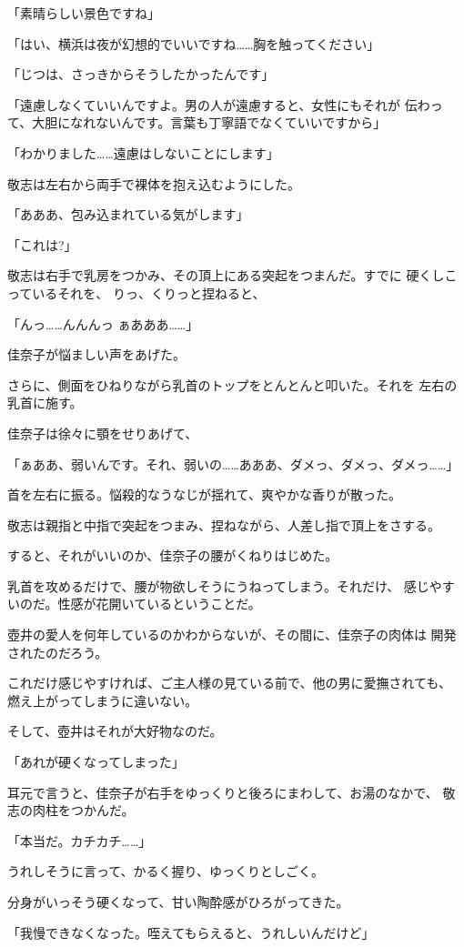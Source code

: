 ﻿\documentclass[
    book,tate,
    line_length=30zw,
    jafontsize=12pt,
    paper=b5j,
    landscape,
    ]{jlreq}
\begin{document}
「素晴らしい景色ですね」

「はい、横浜は夜が幻想的でいいですね……胸を触ってください」

「じつは、さっきからそうしたかったんです」

「遠慮しなくていいんですよ。男の人が遠慮すると、女性にもそれが
伝わって、大胆になれないんです。言葉も丁寧語でなくていいですから」

「わかりました……遠慮はしないことにします」

敬志は左右から両手で裸体を抱え込むようにした。

「あああ、包み込まれている気がします」

「これは?」

敬志は右手で乳房をつかみ、その頂上にある突起をつまんだ。すでに
硬くしこっているそれを、 りっ、くりっと捏ねると、

「んっ……んんんっ ぁあああ……」

佳奈子が悩ましい声をあげた。

さらに、側面をひねりながら乳首のトップをとんとんと叩いた。それを
左右の乳首に施す。

佳奈子は徐々に顎をせりあげて、

「ぁああ、弱いんです。それ、弱いの……あああ、ダメっ、ダメっ、ダメっ……」

首を左右に振る。悩殺的なうなじが揺れて、爽やかな香りが散った。

敬志は親指と中指で突起をつまみ、捏ねながら、人差し指で頂上をさする。

すると、それがいいのか、佳奈子の腰がくねりはじめた。

乳首を攻めるだけで、腰が物欲しそうにうねってしまう。それだけ、
感じやすいのだ。性感が花開いているということだ。

壺井の愛人を何年しているのかわからないが、その間に、佳奈子の肉体は
開発されたのだろう。

これだけ感じやすければ、ご主人様の見ている前で、他の男に愛撫されても、
燃え上がってしまうに違いない。

そして、壺井はそれが大好物なのだ。

「あれが硬くなってしまった」

耳元で言うと、佳奈子が右手をゆっくりと後ろにまわして、お湯のなかで、
敬志の肉柱をつかんだ。

「本当だ。カチカチ……」

うれしそうに言って、かるく握り、ゆっくりとしごく。

分身がいっそう硬くなって、甘い陶酔感がひろがってきた。

「我慢できなくなった。咥えてもらえると、うれしいんだけど」
\end{document}
